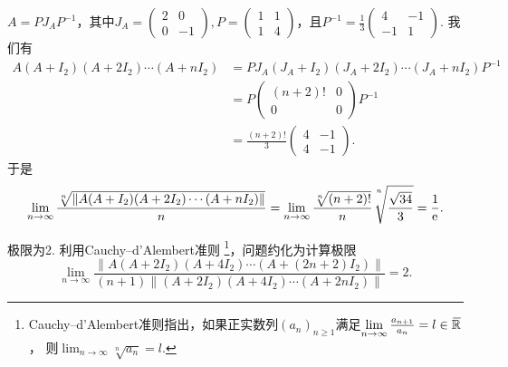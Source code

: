 \begin{solution}
  \begin{inparaenum}[(a)]
    \item $A=PJ_AP^{-1}$，其中$J_A=\begin{pmatrix}
      2 & 0 \\
      0 & -1
    \end{pmatrix},P=\begin{pmatrix}
      1 & 1 \\
      1 & 4
    \end{pmatrix}$，且$P^{-1}=\frac13\begin{pmatrix}
      4 & -1 \\
      -1 & 1
    \end{pmatrix}$. 我们有
    \begin{align*}
      A(A + I_2)(A + 2I_2) \cdots (A + nI_2) & = PJ_A(J_A + I_2) (J_A + 2I_2) \cdots (J_A + nI_2) P^{-1} \\
      & = P \begin{pmatrix}
        (n+2)! & 0 \\
        0 & 0
      \end{pmatrix} P^{-1} \\
      & = \frac{(n+2)!}3\begin{pmatrix}
        4 & -1 \\
        4 & -1
      \end{pmatrix}.
    \end{align*}
    于是
    \[
      \lim_{n\to\infty} \frac{\sqrt[n]{\|
        A(A+I_2)(A+2I_2)\cdots(A+nI_2)
      \|}}n = \lim_{n\to\infty} \frac{\sqrt[n]{(n+2)!}}n \sqrt[\uproot{15}n]{\frac{\sqrt{34}}3} = \frac1\ee.
    \]

    \item 极限为2. 利用Cauchy--d'Alembert准则 \footnote{Cauchy--d'Alembert准则指出，如果正实数列$(a_n)_{n\ge1}$满足$\lim_{n\to\infty}\frac{a_{n+1}}{a_n}=l\in\bar{\MR}$，
        则$\lim_{n\to\infty}\sqrt[n]{a_n}=l$.}，问题约化为计算极限
        \[
          \lim_{n\to\infty} \frac{
            \| A(A+2I_2)(A+4I_2)\cdots(A+(2n+2)I_2) \|
          }{(n+1)\|(A+2I_2)(A+4I_2)\cdots(A+2nI_2)\|} = 2.
        \]


\end{inparaenum}
\end{solution}
